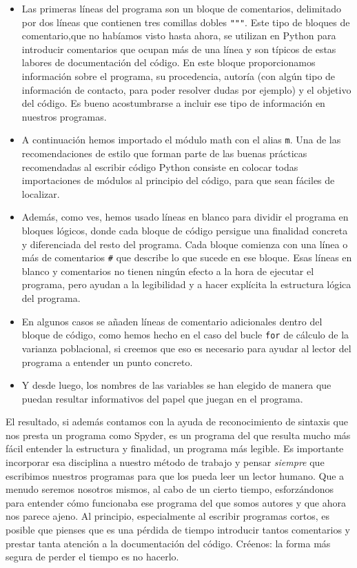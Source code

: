 \documentclass[10pt,a4paper]{article}\usepackage[]{graphicx}\usepackage[]{color}
\newcounter {cont01}
\begin{document}
\begin{itemize}
  \item Las primeras líneas del programa son un bloque de comentarios, delimitado por dos líneas que contienen tres comillas dobles \verb&"""&. Este tipo de bloques de comentario,que no habíamos visto hasta ahora, se utilizan en Python para introducir comentarios que ocupan más de una línea y son típicos de estas labores de documentación del código.   En este bloque proporcionamos información sobre el programa, su procedencia, autoría (con algún tipo de información de contacto, para poder resolver dudas por ejemplo) y el objetivo del código. Es bueno acostumbrarse a incluir ese tipo de información en nuestros programas. 
  
  \item A continuación hemos importado el módulo math con el alias {\tt m}. Una de las {\sf recomendaciones de estilo} que forman parte de las buenas prácticas recomendadas al escribir código Python consiste en colocar todas importaciones de módulos al principio del código, para que sean fáciles de localizar.
  
  \item Además, como ves, hemos usado líneas en blanco para dividir el programa en bloques lógicos, donde cada bloque de código persigue una finalidad concreta y diferenciada del resto del programa. Cada bloque comienza con una línea o más de comentarios \verb&#& que describe lo que sucede en ese bloque. Esas líneas en blanco y comentarios no tienen ningún efecto a la hora de ejecutar el programa, pero ayudan a la legibilidad y a hacer explícita la estructura lógica del programa.
  
  \item En algunos casos se añaden líneas de comentario adicionales dentro del bloque de código, como hemos hecho en el caso del bucle {\tt for} de cálculo de la varianza poblacional, si creemos que eso es necesario para ayudar al lector del programa a entender un punto concreto.
  
  \item Y desde luego, los nombres de las variables se han elegido de manera que puedan resultar informativos del papel que juegan en el programa. 

\end{itemize}

El resultado, si además contamos con la ayuda de reconocimiento de sintaxis que nos presta un programa como Spyder, es un programa del que resulta mucho más fácil entender la estructura y finalidad, un programa más legible. Es importante incorporar esa disciplina a nuestro método de trabajo y pensar {\em siempre} que escribimos nuestros programas para que los pueda leer un lector humano. Que a menudo seremos nosotros mismos, al cabo de un cierto tiempo, esforzándonos para entender cómo funcionaba ese programa del que somos autores y que ahora nos parece ajeno. Al principio, especialmente al escribir programas cortos, es posible que pienses que es una pérdida de tiempo introducir tantos comentarios y prestar tanta atención a la documentación del código. Créenos: la forma más segura de perder el tiempo es no hacerlo.
\end{document}
